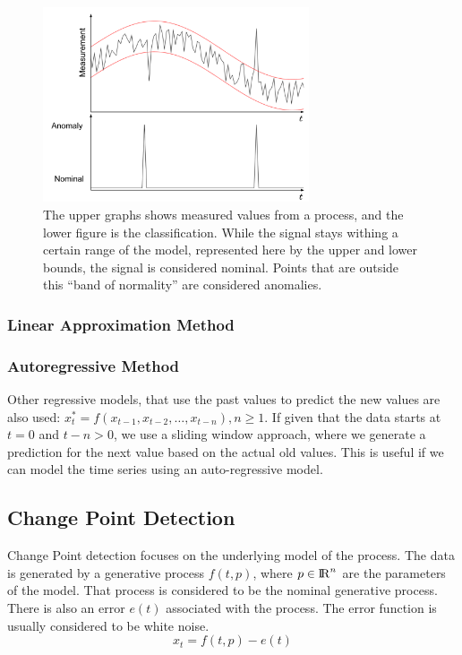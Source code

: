 \documentclass[a4paper, 10pt]{article}
\begin{document}
\begin{figure}
\centering
\includegraphics[width=0.7\textwidth]{Outlier}
\caption{The upper graphs shows measured values from a process, and the lower figure is the classification. While the signal stays withing a certain range of the model, represented here by the upper and lower bounds, the signal is considered nominal. Points that are outside this ``band of normality'' are considered anomalies.}
\label{fig:outlier}
\end{figure}

\subsubsection{Linear Approximation Method}

\subsubsection{Autoregressive Method}

Other regressive models, that use the past values to predict the new values are also used: $x_t^* = f(x_{t-1}, x_{t-2}, \dots, x_{t-n}), n \ge 1$. If given that the data starts at $t=0$ and $t-n > 0$, we use a sliding window approach, where we generate a prediction for the next value based on the actual old values. This is useful if we can model the time series using an auto-regressive model.

\subsection{Change Point Detection}

Change Point detection focuses on the underlying model of the process. The data is generated by a generative process $f(t, p)$, where $p \in {\rm I\!R}^n$ are the parameters of the model. That process is considered to be the nominal generative process. There is also an error $e(t)$ associated with the process. The error function is usually considered to be white noise.
$$x_t = f(t, p) - e(t)$$
\end{document}
